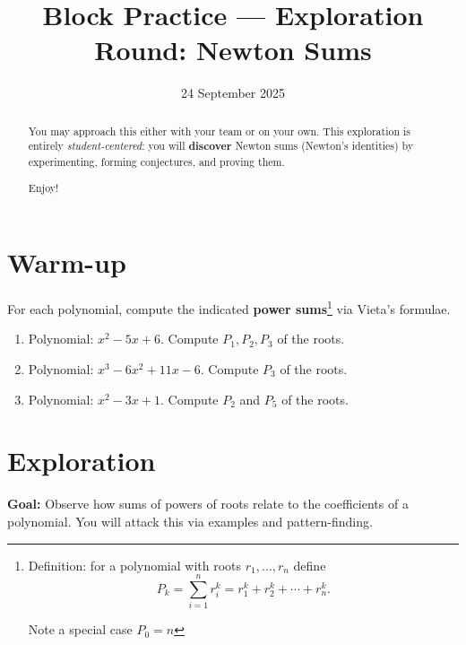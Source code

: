 \documentclass{tufte-handout}
\title{Block Practice — Exploration Round: Newton Sums}
\author[IA Math Team]{}
\date{24 September 2025}
\newcommand{\nn}[1]{\vspace{#1}\noindent}
\begin{document}
\maketitle

\begin{abstract}
You may approach this either with your team or on your own.
This exploration is entirely \emph{student-centered}: you will \textbf{discover} Newton sums (Newton's identities) by experimenting, forming conjectures, and proving them.

\nn{1em}Enjoy!

\end{abstract}

\section*{Warm-up}
For each polynomial, compute the indicated \textbf{power sums}\footnote{Definition: for a polynomial with roots $r_1,\dots,r_n$ define
\[
P_k=\sum_{i=1}^n r_i^k = r_1^k+r_2^k+\cdots+r_n^k.
\]

Note a special case $P_0=n$
} via Vieta's formulae. 

\vspace{1em}
\begin{enumerate}[label=\textbf{W\arabic*.}, leftmargin=*, itemsep=2em]
  \item Polynomial: $x^2-5x+6$. Compute $P_1, P_2, P_3$ of the roots.
  \item Polynomial: $x^3-6x^2+11x-6$. Compute $P_3$ of the roots.
  \item Polynomial: $x^2-3x+1$. Compute $P_2$ and $P_5$ of the roots.
\end{enumerate}

\vspace{2em}
\section*{Exploration}
\textbf{Goal:} Observe how sums of powers of roots relate to the coefficients of a polynomial.
You will attack this via examples and pattern-finding.
\end{document}
